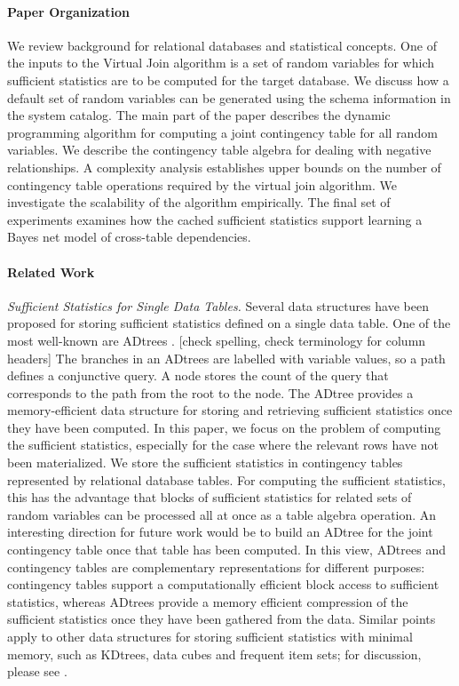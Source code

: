 \documentclass{vldb}
\begin{document}
\paragraph{Paper Organization} We review background for relational databases and statistical concepts. One of the inputs to the Virtual Join algorithm is a set of random variables for which sufficient statistics are to be computed for the target database. We discuss how a default set of random variables can be generated using the schema information in the system catalog. The main part of the paper describes the dynamic programming algorithm for computing a joint contingency table for all random variables. We describe the contingency table algebra for dealing with negative relationships. A  complexity analysis establishes upper bounds on the number of contingency table operations required by the virtual join algorithm. We investigate the scalability of the algorithm empirically. The final set of experiments examines how the cached sufficient statistics support learning a Bayes net model of cross-table dependencies.



\paragraph{Related Work} 

{\em Sufficient Statistics for Single Data Tables.} Several data structures have been proposed for storing sufficient statistics defined on a single data table. 
One of the most well-known are ADtrees \cite{Moore1998}. [check spelling, check terminology for column headers] The branches in an ADtrees are labelled with variable values, so a path defines a conjunctive query. A node stores the count of the query that corresponds to the path from the root to the node. The ADtree provides a memory-efficient data structure for storing and retrieving sufficient statistics once they have been computed. In this paper, we focus on the problem of computing the sufficient statistics, especially for the case where the relevant rows have not been materialized. We store the sufficient statistics in contingency tables represented by relational database tables. For computing the sufficient statistics, this has the advantage that blocks of sufficient statistics for related sets of random variables can be processed all at once as a table algebra operation. An interesting direction for future work would be to build an ADtree for the joint contingency table once that table has been computed. In this view, ADtrees and contingency tables are complementary representations for different purposes: contingency tables support a computationally efficient block access to sufficient statistics, whereas ADtrees provide a memory efficient compression of the sufficient statistics once they have been gathered from the data. Similar points apply to other data structures for storing sufficient statistics with minimal memory, such as KDtrees, data cubes and frequent item sets; for discussion, please see \cite{Moore1998}. 
\end{document}
